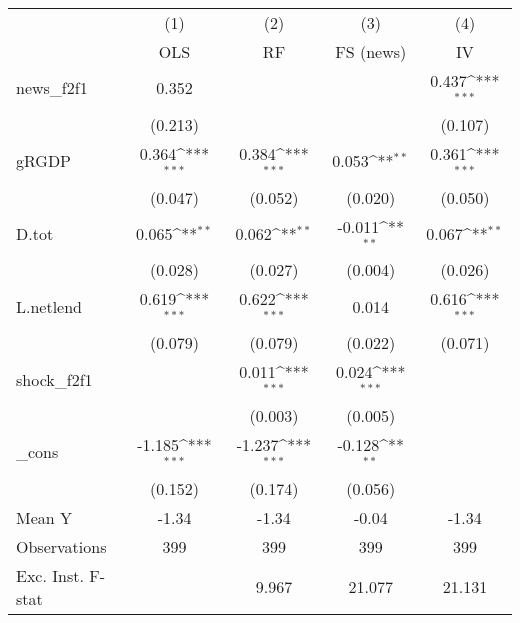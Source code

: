{
\def\sym#1{\ifmmode^{#1}\else\(^{#1}\)\fi}
\begin{tabular}{l*{4}{c}}
\toprule
            &\multicolumn{1}{c}{(1)}&\multicolumn{1}{c}{(2)}&\multicolumn{1}{c}{(3)}&\multicolumn{1}{c}{(4)}\\
            &\multicolumn{1}{c}{OLS}&\multicolumn{1}{c}{RF}&\multicolumn{1}{c}{FS (news)}&\multicolumn{1}{c}{IV}\\
\midrule
news\_f2f1   &       0.352         &                     &                     &       0.437\sym{***}\\
            &     (0.213)         &                     &                     &     (0.107)         \\
\addlinespace
gRGDP       &       0.364\sym{***}&       0.384\sym{***}&       0.053\sym{**} &       0.361\sym{***}\\
            &     (0.047)         &     (0.052)         &     (0.020)         &     (0.050)         \\
\addlinespace
D.tot       &       0.065\sym{**} &       0.062\sym{**} &      -0.011\sym{**} &       0.067\sym{**} \\
            &     (0.028)         &     (0.027)         &     (0.004)         &     (0.026)         \\
\addlinespace
L.netlend   &       0.619\sym{***}&       0.622\sym{***}&       0.014         &       0.616\sym{***}\\
            &     (0.079)         &     (0.079)         &     (0.022)         &     (0.071)         \\
\addlinespace
shock\_f2f1  &                     &       0.011\sym{***}&       0.024\sym{***}&                     \\
            &                     &     (0.003)         &     (0.005)         &                     \\
\addlinespace
\_cons      &      -1.185\sym{***}&      -1.237\sym{***}&      -0.128\sym{**} &                     \\
            &     (0.152)         &     (0.174)         &     (0.056)         &                     \\
\midrule
Mean Y      &       -1.34         &       -1.34         &       -0.04         &       -1.34         \\
Observations&         399         &         399         &         399         &         399         \\
Exc. Inst. F-stat&                     &       9.967         &      21.077         &      21.131         \\
\bottomrule
\end{tabular}
}
